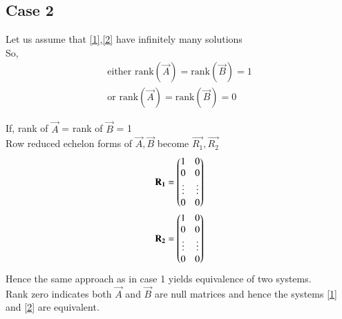 \documentclass[journal,12pt,twocolumn]{IEEEtran}
\begin{document}
\subsection{Case 2}
Let us assume that \eqref{1},\eqref{2} have infinitely many solutions\\
So,
\begin{align}
\text{either rank}(\vec{A}) = \text{rank}(\vec{B}) = 1 \\
\text{or rank}(\vec{A})= \text{rank}(\vec{B}) = 0
\end{align}

If, rank of $\vec{A}$ = rank of $\vec{B}$ = 1\\
Row reduced echelon forms of $\vec{A},\vec{B}$ become $\vec{R_1},\vec{R_2}$ 
\begin{align}
    \mathbf{R_1}=\begin{pmatrix}1&0\\0&0\\\vdots&\vdots\\0&0\end{pmatrix}\\
    \mathbf{R_2}=\begin{pmatrix}1&0\\0&0\\\vdots&\vdots\\0&0\end{pmatrix}
\end{align}
Hence the same approach as in case 1 yields equivalence of two systems.\\
Rank zero indicates both $\vec{A}$ and $\vec{B}$ are null matrices and hence the systems \eqref{1} and \eqref{2} are equivalent.\\
\end{document}
